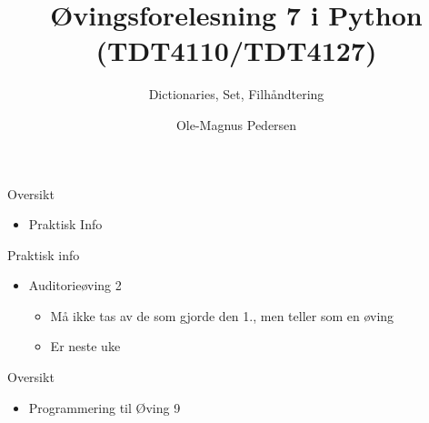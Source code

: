 \documentclass[screen, aspectratio=169]{beamer}
\title[Short title]{Øvingsforelesning 7 i Python (TDT4110/TDT4127)}
\subtitle{Dictionaries, Set, Filhåndtering}
\author[O.M. Pedersen]{Ole-Magnus Pedersen}
\institute[NTNU]{}
\date{}
\begin{document}
\begin{frame}
  \titlepage
\end{frame}


\begin{frame}{Oversikt}
	\begin{itemize}
		\item Praktisk Info
	\end{itemize}
\end{frame}

\begin{frame}{Praktisk info}
	\begin{itemize}
		
	
		\item Auditorieøving 2
		\begin{itemize}
		    \item Må ikke tas av de som gjorde den 1., men teller som en øving
		    \item Er neste uke
		\end{itemize}
	\end{itemize}
\end{frame}

\begin{frame}{Oversikt}
	\begin{itemize}
		\item Programmering til Øving 9
	\end{itemize}
\end{frame}
\end{document}

